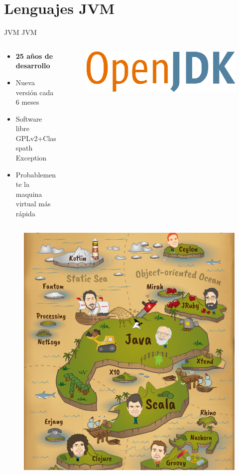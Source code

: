 \documentclass[aspectratio=169]{beamer}
\begin{document}
\section{Lenguajes JVM}
\begin{frame}{JVM}
	JVM

	\begin{columns}[T] %
		\begin{column}[T]{0.5\textwidth} %
			\begin{itemize}
				\item \textbf{25 años de desarrollo}
				\item Nueva versión cada 6 meses
				\item Software libre GPLv2+Classpath Exception
				\item Probablemente la maquina virtual más rápida
			\end{itemize}
		\end{column}
		\begin{column}[T]{7cm} %
			\begin{figure}
				\centering
				\includegraphics[width=\linewidth]{Images/openjdk}
			\end{figure}

		\end{column}
	\end{columns}
\end{frame}
\begin{frame}{}
	\begin{figure}
		\centering
		\includegraphics[width=0.5\linewidth]{Images/pirates}
	\end{figure}

\end{frame}
\end{document}
